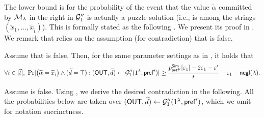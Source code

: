 The lower bound is for the probability of the event that  the value $\tilde{\alpha}$ committed by $\mathcal{M}_\lambda$ in the right  in $\mathcal{G}_1''$ is actually a puzzle solution (i.e., is among the strings $(\tilde{x}_1,\dots,\tilde{x}_{\tilde{t}})$).  This is formally stated as the following . We present its proof in . We remark that  relies on the assumption (for contradiction) that  is false.
\begin{lemma}\label{pq:claim:G1dprime:lowerbound}
    Assume that  is false. Then, for the same parameter settings as in , it holds that 
    $$
    \forall i \in [\widetilde{t}],~\Pr[\big( \widetilde{\alpha} = \widetilde{x}_i \big)\wedge (\widetilde{d} = \top): (\mathsf{OUT},\widetilde{d}) \gets \mathcal{G}_1''(1^\lambda,  \mathsf{pref}')] \geq \frac{p^{\mathsf{Sim}}_{\mathsf{pref'}}[\varepsilon_1] - {2\varepsilon_1}- \varepsilon'}{t} -{\varepsilon_1} -\mathsf{negl}(\lambda).
    $$
\end{lemma}

 Assume  is false. Using , we derive the desired contradiction in the following. All the probabilities below are taken over  $(\mathsf{OUT}, \widetilde{d}) \leftarrow \mathcal{G}''_1(1^\lambda, \mathsf{pref}')$, which we omit for notation succinctness.






